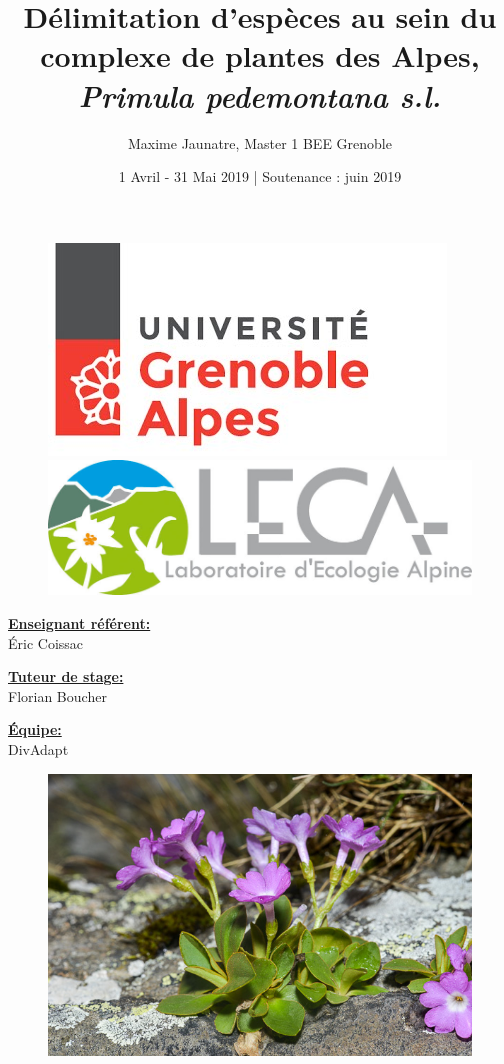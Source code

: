 \documentclass[12pt,a4paper,notitlepage,colorinlistoftodos]{article}
\title{\textbf{Délimitation d'espèces au sein du complexe de plantes des Alpes, \textit{Primula pedemontana s.l.}}}
\author{Maxime Jaunatre, Master 1 BEE Grenoble}
\date{1 Avril - 31 Mai 2019  |  Soutenance : juin 2019 }
\begin{document}
\begin{titlepage} %
\begin{figure}
\noindent
\begin{minipage}{0.5\textwidth}
\centering
\includegraphics[width=0.5\linewidth,left]{fig/UGA.jpg}
\end{minipage}
\begin{minipage}{0.5\textwidth}
\centering
\includegraphics[width=0.5\linewidth,right]{fig/leca.jpg}
\end{minipage}
\end{figure}
\maketitle

\noindent
\begin{minipage}{1.3in}
\textbf{\underline{Enseignant référent:}} \\
Éric Coissac
\end{minipage}
\hfill
\begin{minipage}{1.3in}
\textbf{\underline{Tuteur de stage:}} \\
Florian Boucher
\end{minipage}
\hfill
\begin{minipage}{1.3in}
\textbf{\underline{Équipe:}} \\
DivAdapt
\end{minipage}

\begin{figure}[h]
\begin{center}
\includegraphics[scale=2.8]{fig/primulapedemontana_7.jpg}
\end{center}
\end{figure}
\thispagestyle{empty}


\end{titlepage}
\end{document}
